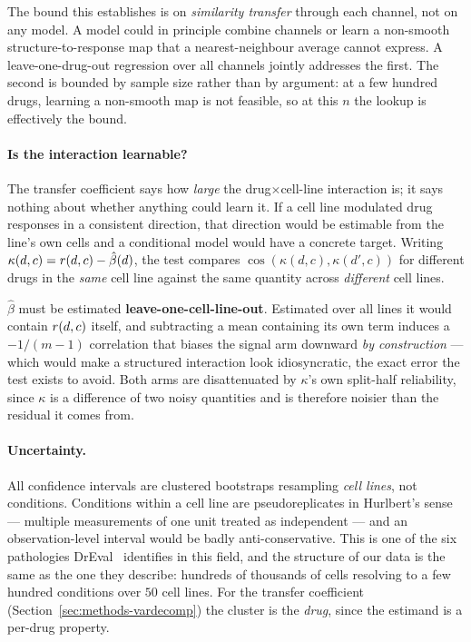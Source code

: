 The bound this establishes is on \emph{similarity transfer} through each channel, not on any model.
A model could in principle combine channels or learn a non-smooth structure-to-response map that a
nearest-neighbour average cannot express. A leave-one-drug-out regression over all channels jointly
addresses the first. The second is bounded by sample size rather than by argument: at a few hundred
drugs, learning a non-smooth map is not feasible, so at this $n$ the lookup is effectively the bound.

\paragraph{Is the interaction learnable?} The transfer coefficient says how \emph{large} the
drug$\times$cell-line interaction is; it says nothing about whether anything could learn it. If a cell
line modulated drug responses in a consistent direction, that direction would be estimable from the
line's own cells and a conditional model would have a concrete target. Writing
$\kappa(d,c) = r(d,c) - \hat{\beta}(d)$, the test compares $\cos(\kappa(d,c), \kappa(d',c))$ for
different drugs in the \emph{same} cell line against the same quantity across \emph{different} cell
lines.

$\hat{\beta}$ must be estimated \textbf{leave-one-cell-line-out}. Estimated over all lines it would
contain $r(d,c)$ itself, and subtracting a mean containing its own term induces a $-1/(m-1)$
correlation that biases the signal arm downward \emph{by construction} --- which would make a
structured interaction look idiosyncratic, the exact error the test exists to avoid. Both arms are
disattenuated by $\kappa$'s own split-half reliability, since $\kappa$ is a difference of two noisy
quantities and is therefore noisier than the residual it comes from.

\paragraph{Uncertainty.} All confidence intervals are clustered bootstraps resampling \emph{cell
lines}, not conditions. Conditions within a cell line are pseudoreplicates in Hurlbert's
sense~\cite{hurlbert} --- multiple measurements of one unit treated as independent --- and an
observation-level interval would be badly anti-conservative. This is one of the six pathologies
DrEval~\cite{dreval} identifies in this field, and the structure of our data is the same as the one
they describe: hundreds of thousands of cells resolving to a few hundred conditions over $50$ cell
lines. For the transfer coefficient
(Section~\ref{sec:methods-vardecomp}) the cluster is the \emph{drug}, since the estimand is a
per-drug property.

